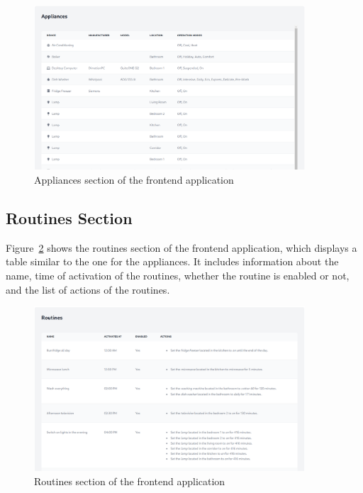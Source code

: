 \begin{figure}
    \centering
    \includegraphics[width=0.9\textwidth]{images/frontend/appliances.png}
    \caption{Appliances section of the frontend application}%
    \label{fig:frontend_appliances}
\end{figure}

\subsection{Routines Section}

Figure~\ref{fig:frontend_routines} shows the routines section of the frontend application, which displays a table similar to the one for the appliances. It includes information about the name, time of activation of the routines, whether the routine is enabled or not, and the list of actions of the routines.

\begin{figure}
    \centering
    \includegraphics[width=0.9\textwidth]{images/frontend/routines.png}
    \caption{Routines section of the frontend application}%
    \label{fig:frontend_routines}
\end{figure}